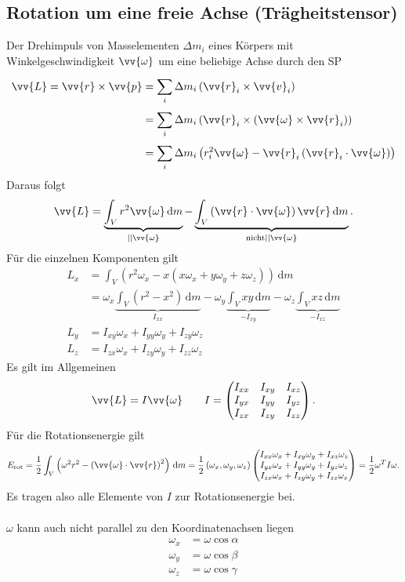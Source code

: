 \documentclass[a4paper,12pt]{article}
\newcommand{\td}{\,\text{d}}
\begin{document}
\subsection{Rotation um eine freie Achse (Trägheitstensor)}
Der Drehimpuls von Masselementen $\Delta m_i$ eines Körpers mit Winkelgeschwindigkeit $\vv{\omega }$ um eine beliebige Achse durch den SP
\begin{align*}
        \vv{L}=\vv{r}\times \vv{p}&=\sum_{i}^{}\Delta m_i\left(\vv{r}_i\times \vv{v}_i\right)\\
                                  &=\sum_{i}^{}\Delta m_i\left(\vv{r}_i\times\left(\vv{\omega }\times \vv{r}_i\right)\right)\\
                                  &=\sum_{i}^{}\Delta m_i\left(r_i^2\vv{\omega }-\vv{r}_i\left(\vv{r}_i\cdot \vv{\omega }\right)\right)
\end{align*}
Daraus folgt
\[ 
        \vv{L}=\underbrace{\int_{V}^{}r^2\vv{\omega }\td m}_{||\vv{\omega }}-\underbrace{\int_{V}^{}\left(\vv{r}\cdot \vv{\omega }\right)\vv{r}\td m}_{\text{nicht}||\vv{\omega }}
.\] 
Für die einzelnen Komponenten gilt
\begin{align*}
        L_x&=\int_{V}^{}\left(r^2\omega _x-x\left(x\omega _x+y\omega _y+z\omega _z\right)\right)\td m\\
           &=\omega _x\underbrace{\int_{V}^{}\left(r^2-x^2\right)\td m}_{I_{xx}}-\omega _y\underbrace{\int_{V}^{}xy\td m}_{-I_{xy}}-\omega _z\underbrace{\int_{V}^{}xz\td m}_{-I_{xz}}\\
        L_y&=I_{xy}\omega _x+I_{yy}\omega _y+I_{zy}\omega _z\\
        L_z&=I_{zx}\omega _x+I_{zy}\omega _y+I_{zz}\omega _z
\end{align*}
Es gilt im Allgemeinen
\[ 
        \vv{L}=I\vv{\omega }\qquad I=\left(\begin{matrix}
                        I_{xx}&I_{xy}&I_{xz}\\I_{yx}&I_{yy}&I_{yz}\\I_{zx}&I_{zy}&I_{zz}
        \end{matrix}\right)
.\] 
Für die Rotationsenergie gilt
\[ 
        E_{\text{rot}}=\dfrac{1}{2}\int_{V}^{}\left(\omega ^2r^2-\left(\vv{\omega }\cdot \vv{r}\right)^2\right)\td m=\dfrac{1}{2}\left(\omega _x,\omega _y,\omega _z\right)\left(\begin{matrix}
                        I_{xx}\omega _x+I_{xy}\omega _y+I_{xz}\omega _z\\
                        I_{yx}\omega _x+I_{yy}\omega _y+I_{yz}\omega _z\\
                        I_{zx}\omega _x+I_{zy}\omega _y+I_{zz}\omega _z
        \end{matrix}\right)=\dfrac{1}{2}\omega ^TI\omega 
.\] 
Es tragen also alle Elemente von $I$ zur Rotationsenergie bei.\\\\
$\omega $ kann auch nicht parallel zu den Koordinatenachsen liegen
\begin{align*} %
        \omega _x&=\omega \cos \alpha \\
        \omega _y&=\omega \cos \beta \\
        \omega _z&=\omega \cos \gamma 
\end{align*}
\end{document}
